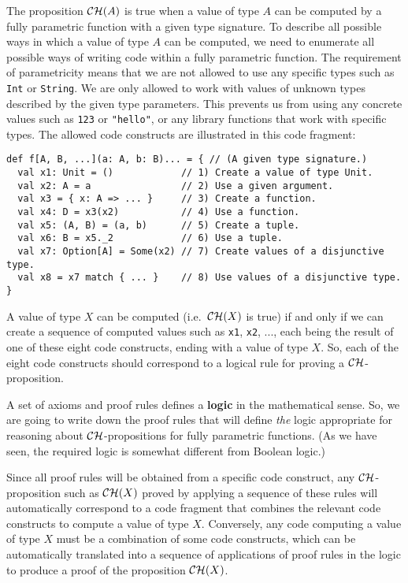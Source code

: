 The proposition ${\cal CH}(A)$ is true when a value of type $A$
can be computed by a fully parametric function with a given type signature.
To describe all possible ways in which a value of type $A$ can be
computed, we need to enumerate all possible ways of writing code within
a fully parametric function. The requirement of parametricity means
that we are not allowed to use any specific types such as \lstinline!Int!
or \lstinline!String!.
We are only allowed to work with values of unknown types described
by the given type parameters. This prevents us from using any concrete
values such as \lstinline!123!
or \lstinline!"hello"!,
or any library functions that work with specific types. The allowed
code constructs are illustrated in this code fragment:
\begin{lstlisting}
def f[A, B, ...](a: A, b: B)... = { // (A given type signature.)
  val x1: Unit = ()            // 1) Create a value of type Unit.
  val x2: A = a                // 2) Use a given argument.
  val x3 = { x: A => ... }     // 3) Create a function.
  val x4: D = x3(x2)           // 4) Use a function.
  val x5: (A, B) = (a, b)      // 5) Create a tuple.
  val x6: B = x5._2            // 6) Use a tuple.
  val x7: Option[A] = Some(x2) // 7) Create values of a disjunctive type.
  val x8 = x7 match { ... }    // 8) Use values of a disjunctive type.
}
\end{lstlisting}
A value of type $X$ can be computed (i.e.~${\cal CH}(X)$ is true)
if and only if we can create a sequence of computed values such as
\lstinline!x1!, \lstinline!x2!,
..., each being the result of one of these eight code constructs,
ending with a value of type $X$. So, each of the eight code constructs
should correspond to a logical rule for proving a ${\cal CH}$-proposition.

A set of axioms and proof rules defines a \textbf{logic}
in the mathematical sense. So, we are going to write down the proof
rules that will define \emph{the} logic appropriate for reasoning
about ${\cal CH}$-propositions for fully parametric functions. (As
we have seen, the required logic is somewhat different from Boolean
logic.)

Since all proof rules will be obtained from a specific code construct,
any ${\cal CH}$-proposition such as ${\cal CH}(X)$ proved by applying
a sequence of these rules will automatically correspond to a code
fragment that combines the relevant code constructs to compute a value
of type $X$. Conversely, any code computing a value of type $X$
must be a combination of some code constructs, which can be automatically
translated into a sequence of applications of proof rules in the logic
to produce a proof of the proposition ${\cal CH}(X)$.


